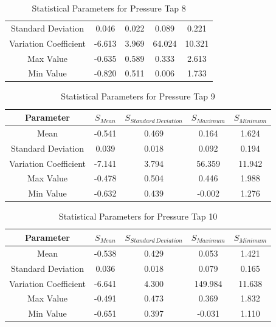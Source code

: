 \documentclass[11pt,a4paper,titlepage]{report}
\begin{document}
\begin{appendix}
\begin{table}[h]
\begin{tabular}{c|c|c|c|c}
Standard Deviation    & 0.046  & 0.022 & 0.089  & 0.221  \\
Variation Coefficient & -6.613 & 3.969 & 64.024 & 10.321 \\
Max Value             & -0.635 & 0.589 & 0.333  & 2.613  \\
Min Value             & -0.820 & 0.511 & 0.006  & 1.733 
    \end{tabular}
    \caption{Statistical Parameters for Pressure Tap 8}
    \label{tab:wind statistical parameters 8}
\end{table}
\begin{table}[h]
    \centering
    \begin{tabular}{c|c|c|c|c}
   Parameter  & $S_{Mean}$ & $S_{Standard\,Deviation}$ & $S_{Maximum}$ &	$S_{Minimum}$ \\
    \hline
Mean                  & -0.541 & 0.469 & 0.164  & 1.624  \\
Standard Deviation    & 0.039  & 0.018 & 0.092  & 0.194  \\
Variation Coefficient & -7.141 & 3.794 & 56.359 & 11.942 \\
Max Value             & -0.478 & 0.504 & 0.446  & 1.988  \\
Min Value             & -0.632 & 0.439 & -0.002 & 1.276 
    \end{tabular}
    \caption{Statistical Parameters for Pressure Tap 9}
    \label{tab:wind statistical parameters 9}
\end{table}
\begin{table}[h]
    \centering
    \begin{tabular}{c|c|c|c|c}
   Parameter  & $S_{Mean}$ & $S_{Standard\,Deviation}$ & $S_{Maximum}$ &	$S_{Minimum}$ \\
    \hline
  Mean                  & -0.538 & 0.429 & 0.053   & 1.421  \\
Standard Deviation    & 0.036  & 0.018 & 0.079   & 0.165  \\
Variation Coefficient & -6.641 & 4.300 & 149.984 & 11.638 \\
Max Value             & -0.491 & 0.473 & 0.369   & 1.832  \\
Min Value             & -0.651 & 0.397 & -0.031  & 1.110 
    \end{tabular}
    \caption{Statistical Parameters for Pressure Tap 10}
    \label{tab:wind statistical parameters 10}
\end{table}
\begin{table}[h]
    \centering
    \begin{tabular}{c|c|c|c|c}

\end{tabular}
\end{table}
\end{appendix}
\end{document}
